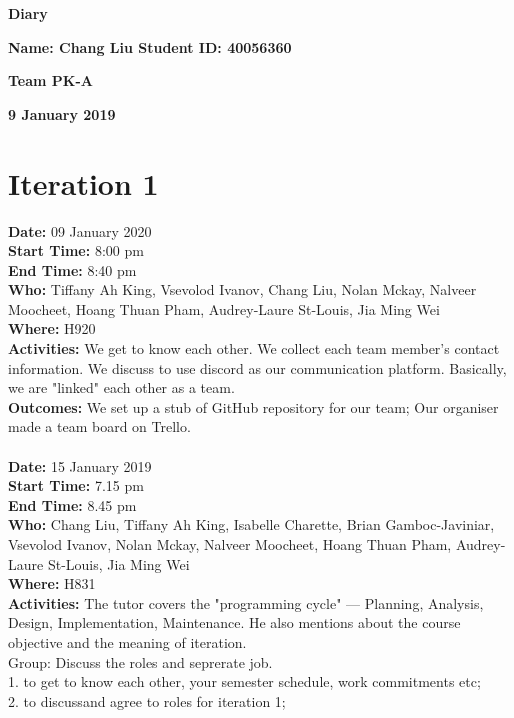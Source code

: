 \documentclass[12pt]{article}
\begin{document}
\vspace*{0.2in}
\centerline{\bf\Large Diary}

\vspace*{0.2in}
\centerline{\bf\Large Name: Chang Liu Student ID: 40056360}

\vspace*{0.2in}
\centerline{\bf\Large Team PK-A}

\vspace*{0.2in}
\centerline{\bf\Large 9 January 2019}

\section{Iteration 1}
{\bf Date:} 09 January 2020\\
{\bf Start Time:} 8:00 pm\\
{\bf End Time:}  8:40 pm\\
{\bf Who:} Tiffany Ah King, Vsevolod Ivanov, Chang Liu, Nolan Mckay, Nalveer Moocheet, Hoang Thuan Pham, Audrey-Laure St-Louis, Jia Ming Wei\\
{\bf Where:} H920 \\
{\bf Activities:} We get to know each other. We collect each team member's contact information. We discuss to use discord as our communication platform. Basically, we are "linked" each other as a team.\\
{\bf Outcomes:}  We set up a stub of GitHub repository for our team; Our organiser made a team board on Trello. \\\\
{\bf Date:} 15 January 2019\\
{\bf Start Time:} 7.15 pm\\
{\bf End Time:} 8.45 pm \\
{\bf Who:} Chang Liu, Tiffany Ah King, Isabelle Charette, Brian Gamboc-Javiniar, Vsevolod Ivanov, Nolan Mckay, Nalveer Moocheet, Hoang Thuan Pham, Audrey-Laure St-Louis, Jia Ming Wei\\
{\bf Where:} H831 \\
{\bf Activities:} The tutor covers the "programming cycle" --- Planning, Analysis, Design, Implementation, Maintenance. He also mentions about the course objective and the meaning of iteration.\\
Group: Discuss the roles and seprerate job.\\
1. to get to know each other, your semester schedule, work commitments etc;\\
2. to discussand agree to roles for iteration 1;\\
\end{document}
